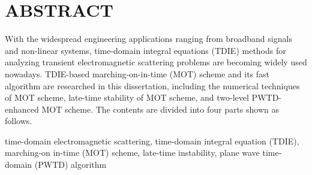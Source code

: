 \chapter*{\bf ABSTRACT}

With the widespread engineering applications ranging from broadband
signals and non-linear systems, time-domain integral equations (TDIE)
methods for analyzing transient electromagnetic scattering problems
are becoming widely used nowadays. TDIE-based marching-on-in-time
(MOT) scheme and its fast algorithm are researched in this
dissertation, including the numerical techniques of MOT scheme,
late-time stability of MOT scheme, and two-level PWTD-enhanced MOT
scheme. The contents are divided into four parts shown as follows.

\bigskip

%
%
time-domain electromagnetic scattering,
time-domain integral equation (TDIE),
marching-on in-time (MOT) scheme,
late-time instability,
plane wave time-domain (PWTD) algorithm
